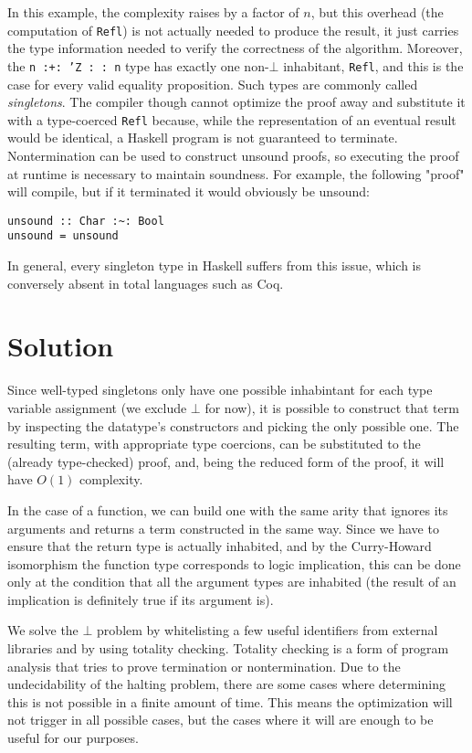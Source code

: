 In this example, the complexity raises by a factor of $n$, but this overhead (the computation of \texttt{Refl}) is not actually needed to produce the result, it just carries the type information needed to verify the correctness of the algorithm.
Moreover, the \texttt{n :+: 'Z :~: n} type has exactly one non-$\bot$ inhabitant, \texttt{Refl}, and this is the case for every valid equality proposition. Such types are commonly called \emph{singletons}.
The compiler though cannot optimize the proof away and substitute it with a type-coerced \texttt{Refl} because, while the representation of an eventual result would be identical, a Haskell program is not guaranteed to terminate. Nontermination can be used to construct unsound proofs, so executing the proof at runtime is necessary to maintain soundness. For example, the following "proof" will compile, but if it terminated it would obviously be unsound:

\begin{lstlisting}[caption=Proving the false through nontermination]
unsound :: Char :~: Bool
unsound = unsound
\end{lstlisting}

In general, every singleton type in Haskell suffers from this issue, which is conversely absent in total languages such as Coq.

\chapter{Solution}
\label{sec:solution}

Since well-typed singletons only have one possible inhabintant for each type variable assignment (we exclude $\bot$ for now), it is possible to construct that term by inspecting the datatype's constructors and picking the only possible one.
The resulting term, with appropriate type coercions, can be substituted to the (already type-checked) proof, and, being the reduced form of the proof, it will have $O(1)$ complexity.

In the case of a function, we can build one with the same arity that ignores its arguments and returns a term constructed in the same way.
Since we have to ensure that the return type is actually inhabited, and by the Curry-Howard isomorphism the function type corresponds to logic implication, this can be done only at the condition that all the argument types are inhabited (the result of an implication is definitely true if its argument is).

We solve the $\bot$ problem by whitelisting a few useful identifiers from external libraries and by using totality checking.
Totality checking is a form of program analysis that tries to prove termination or nontermination.
Due to the undecidability of the halting problem, there are some cases where determining this is not possible in a finite amount of time.
This means the optimization will not trigger in all possible cases, but the cases where it will are enough to be useful for our purposes.

